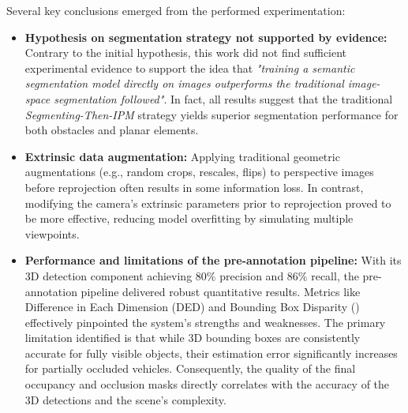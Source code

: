 Several key conclusions emerged from the performed experimentation:
\begin{itemize}

    \item \textbf{Hypothesis on segmentation strategy not supported by evidence:} Contrary to the initial hypothesis, this work did not find sufficient experimental evidence to support the idea that \textit{"training a semantic segmentation model directly on  images outperforms the traditional image-space segmentation followed"}. In fact, all results suggest that the traditional \textit{Segmenting-Then-IPM} strategy yields superior segmentation performance for both obstacles and planar elements.

    \item \textbf{Extrinsic  data augmentation:} Applying traditional geometric augmentations (e.g., random crops, rescales, flips) to perspective images before  reprojection often results in some information loss. In contrast, modifying the camera's extrinsic parameters prior to  reprojection proved to be more effective, reducing model overfitting by simulating multiple viewpoints.

    \item \textbf{Performance and limitations of the pre-annotation pipeline:} With its 3D detection component achieving $80\%$ precision and $86\%$ recall, the pre-annotation pipeline delivered robust quantitative results. Metrics like Difference in Each Dimension (DED) and Bounding Box Disparity () effectively pinpointed the system's strengths and weaknesses. The primary limitation identified is that while 3D bounding boxes are consistently accurate for fully visible objects, their estimation error significantly increases for partially occluded vehicles. Consequently, the quality of the final occupancy and occlusion masks directly correlates with the accuracy of the 3D detections and the scene's complexity.

\end{itemize}

